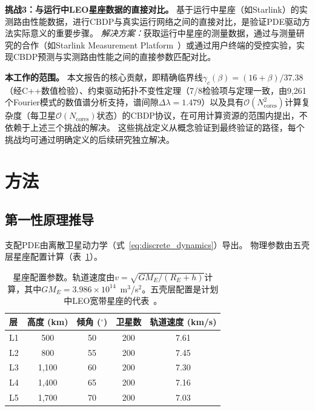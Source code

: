\documentclass[sn-nature,pdflatex]{sn-jnl}
\begin{document}
\medskip
\noindent\textbf{挑战3：与运行中LEO星座数据的直接对比。}
基于运行中星座（如Starlink）的实测路由性能数据，进行CBDP与真实运行网络之间的直接对比，是验证PDE驱动方法实际意义的重要步骤。
\textit{解决方案：}获取运行中星座的测量数据，通过与测量研究的合作（如Starlink Measurement Platform~\cite{izhikevich_2024_sigmetrics}）或通过用户终端的受控实验，实现CBDP预测与实测路由性能之间的直接参数匹配对比。

\medskip
\noindent\textbf{本工作的范围。}
本文报告的核心贡献，即精确临界线$\gamma_c(\beta) = (16+\beta)/37.38$（经C++数值检验）、约束驱动拓扑不变性定理（7/8检验项与定理一致，由9,261个Fourier模式的数值谱分析支持，谱间隙$\Delta\lambda = 1.479$）以及具有$\mathcal{O}(N_{\text{cores}}^2)$计算复杂度（每卫星$\mathcal{O}(N_{\text{cores}})$状态）的CBDP协议，在可用计算资源的范围内提出，不依赖于上述三个挑战的解决。
这些挑战定义从概念验证到最终验证的路径，每个挑战均可通过明确定义的后续研究独立解决。

\section{方法}

\subsection{第一性原理推导}

支配PDE由离散卫星动力学（式~\ref{eq:discrete_dynamics}）导出。
物理参数由五壳层星座配置计算（表~\ref{tab:constellation_params}）。

\begin{table}[htbp]
\centering
\caption{星座配置参数。轨道速度由$v = \sqrt{GM_E/(R_E + h)}$计算，其中$GM_E = 3.986\times10^{14}$~m$^3$/s$^2$。五壳层配置是计划中LEO宽带星座的代表~\cite{del_portillo_2019,handley_2018}。}
\label{tab:constellation_params}
\begin{tabular}{lcccc}
\toprule
层 & 高度 (km) & 倾角 (${}^\circ$) & 卫星数 & 轨道速度 (km/s) \\
\midrule
L1 & 500  & 50 & 200 & 7.61 \\
L2 & 800  & 55 & 200 & 7.45 \\
L3 & 1,100 & 60 & 200 & 7.30 \\
L4 & 1,400 & 65 & 200 & 7.16 \\
L5 & 1,700 & 70 & 200 & 7.03 \\
\bottomrule
\end{tabular}
\end{table}
\end{document}
